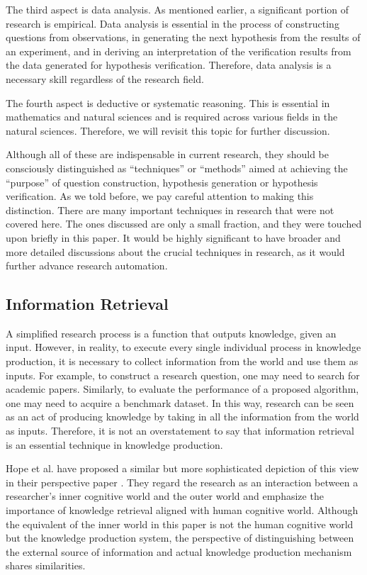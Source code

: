 The third aspect is data analysis. As mentioned earlier, a significant portion of research is empirical. Data analysis is essential in the process of constructing questions from observations, in generating the next hypothesis from the results of an experiment, and in deriving an interpretation of the verification results from the data generated for hypothesis verification. Therefore, data analysis is a necessary skill regardless of the research field. 

The fourth aspect is deductive or systematic reasoning. This is essential in mathematics and natural sciences and is required across various fields in the natural sciences. Therefore, we will revisit this topic for further discussion. 

Although all of these are indispensable in current research, they should be consciously distinguished as ``techniques'' or ``methods'' aimed at achieving the ``purpose'' of question construction, hypothesis generation or hypothesis verification. As we told before, we pay careful attention to making this distinction. There are many important techniques in research that were not covered here. The ones discussed are only a small fraction, and they were touched upon briefly in this paper. It would be highly significant to have broader and more detailed discussions about the crucial techniques in research, as it would further advance research automation.

\subsection{Information Retrieval}
A simplified research process is a function that outputs knowledge, given an input. However, in reality, to execute every single individual process in knowledge production, it is necessary to collect information from the world and use them as inputs. For example, to construct a research question, one may need to search for academic papers. Similarly, to evaluate the performance of a proposed algorithm, one may need to acquire a benchmark dataset. In this way, research can be seen as an act of producing knowledge by taking in all the information from the world as inputs. Therefore, it is not an overstatement to say that information retrieval is an essential technique in knowledge production. 

Hope et al. have proposed a similar but more sophisticated depiction of this view in their perspective paper \cite{hope2022computational}. They regard the research as an interaction between a researcher’s inner cognitive world and the outer world and emphasize the importance of knowledge retrieval aligned with human cognitive world. Although the equivalent of the inner world in this paper is not the human cognitive world but the knowledge production system, the perspective of distinguishing between the external source of information and actual knowledge production mechanism shares similarities.

